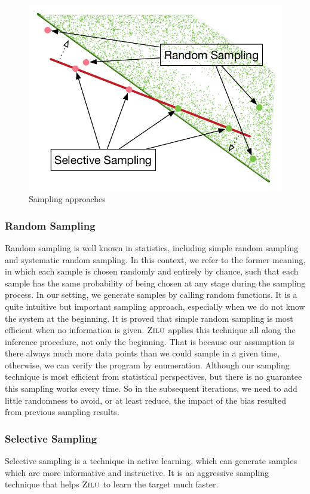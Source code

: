 \begin{figure}[!h]
    \centering
    \includegraphics[scale=0.45]{figures/general-sampling.pdf}
    \caption{Sampling approaches}
    \label{fig:sampling}
\end{figure}


\subsubsection{Random Sampling}
Random sampling is well known in statistics, including simple random sampling and systematic random sampling.
In this context, we refer to the former meaning, in which each sample is chosen randomly and entirely by chance, 
such that each sample has the same probability of being chosen at any stage during the sampling process.
In our setting, we generate samples by calling random functions.
It is a quite intuitive but important sampling approach, especially when we do not know the system at the beginning. 
It is proved that simple random sampling is most efficient when no information is given.
$\textsc{Zilu}$ applies this technique all along the inference procedure, not only the beginning. 
That is because our assumption is there always much more data points than we could sample in a given time,
otherwise, we can verify the program by enumeration.
Although our sampling technique is most efficient from statistical perspectives, 
but there is no guarantee this sampling works every time.
So in the subsequent iterations, we need to add little randomness to avoid, or at least reduce, 
the impact of the bias resulted from previous sampling results.


\subsubsection{Selective Sampling}
Selective sampling is a technique in active learning, which can generate samples which are more informative and instructive.
It is an aggressive sampling technique that helps $\textsc{Zilu}$ to learn the target much faster.

